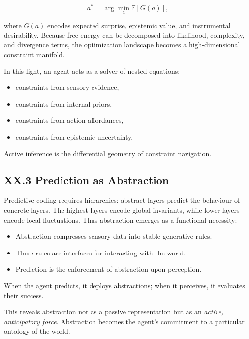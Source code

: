 \documentclass[11pt,letterpaper]{article}
\begin{document}
\[
a^\ast = \arg\min_a \mathbb{E}[G(a)],
\]

where \(G(a)\) encodes expected surprise, epistemic value, and instrumental desirability.  
Because free energy can be decomposed into likelihood, complexity, and divergence terms, the optimization landscape becomes a high-dimensional constraint manifold.

In this light, an agent acts as a solver of nested equations:

\begin{itemize}
    \item constraints from sensory evidence,
    \item constraints from internal priors,
    \item constraints from action affordances,
    \item constraints from epistemic uncertainty.
\end{itemize}

Active inference is the differential geometry of constraint navigation.

\subsection{XX.3 Prediction as Abstraction}

Predictive coding requires hierarchies: abstract layers predict the behaviour of concrete layers.  
The highest layers encode global invariants, while lower layers encode local fluctuations.  
Thus abstraction emerges as a functional necessity:

\begin{itemize}
    \item Abstraction compresses sensory data into stable generative rules.
    \item These rules are interfaces for interacting with the world.
    \item Prediction is the enforcement of abstraction upon perception.
\end{itemize}

When the agent predicts, it deploys abstractions; when it perceives, it evaluates their success.

This reveals abstraction not as a passive representation but as an \emph{active, anticipatory force}.  
Abstraction becomes the agent’s commitment to a particular ontology of the world.
\end{document}
